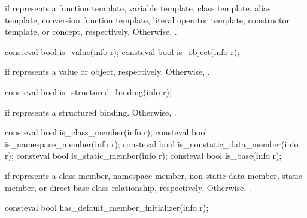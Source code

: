\begin{itemdescr}
\pnum
\returns
{} if  represents a
function template,
variable template,
class template,
alias template,
conversion function template,
literal operator template,
constructor template, or
concept, respectively.
Otherwise, .
\end{itemdescr}

%
%
\begin{itemdecl}
consteval bool is_value(info r);
consteval bool is_object(info r);
\end{itemdecl}

\begin{itemdescr}
\pnum
\returns
{} if  represents a value or object, respectively.
Otherwise, .
\end{itemdescr}

%
\begin{itemdecl}
consteval bool is_structured_binding(info r);
\end{itemdecl}

\begin{itemdescr}
\pnum
\returns
{} if  represents a structured binding.
Otherwise, .
\end{itemdescr}

%
%
%
%
%
\begin{itemdecl}
consteval bool is_class_member(info r);
consteval bool is_namespace_member(info r);
consteval bool is_nonstatic_data_member(info r);
consteval bool is_static_member(info r);
consteval bool is_base(info r);
\end{itemdecl}

\begin{itemdescr}
\pnum
\returns
{} if  represents a
class member,
namespace member,
non-static data member,
static member, or
direct base class relationship, respectively.
Otherwise, .
\end{itemdescr}

%
\begin{itemdecl}
consteval bool has_default_member_initializer(info r);
\end{itemdecl}


